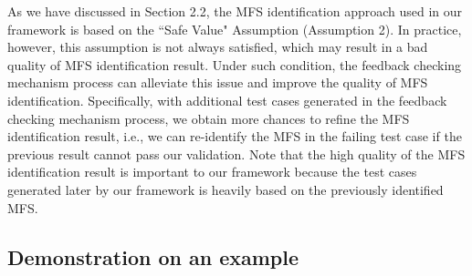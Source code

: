 \documentclass[journal,12pt,onecolumn,draftclsnofoot,]{IEEEtran}
\begin{document}
\begin{enumerate}
As we have discussed in Section 2.2, the MFS identification approach used in our framework is based on the ``Safe Value" Assumption (Assumption 2). In practice, however, this assumption is not always satisfied, which may result in a bad quality of MFS identification result. Under such condition, the feedback checking mechanism  process can alleviate this issue and improve the quality of MFS identification. Specifically, with additional test cases generated in the  feedback checking mechanism  process, we obtain more chances to refine the MFS identification result, i.e., we can re-identify the MFS in the failing test case if the previous result cannot pass our validation. Note that the high quality of the MFS identification result is important to our framework because the test cases generated later by our framework is heavily based on the previously identified MFS.

 \end{enumerate}
\subsection{Demonstration on an example}\label{sec:app:example}
\end{document}
